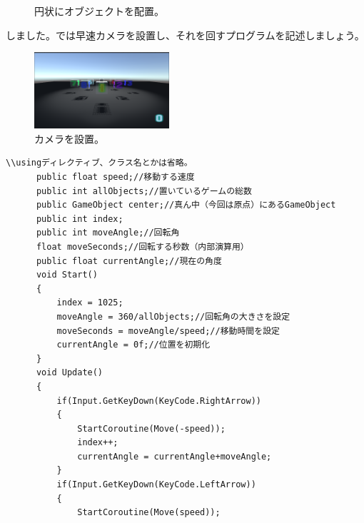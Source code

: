 \documentclass[b5paper,9pt,platex,dvipdfmx]{jsarticle}
\begin{document}
\begin{multicols*}{3}
\begin{figure}[H]
  \caption{円状にオブジェクトを配置。}
\end{figure}
しました。では早速カメラを設置し、それを回すプログラムを記述しましょう。\\
\begin{figure}[H]
  \centering
  \includegraphics[width=5cm]{3.png}
  \caption{カメラを設置。}
\end{figure}
\begin{lstlisting}[caption=MoveNext.cs]
\\usingディレクティブ、クラス名とかは省略。
      public float speed;//移動する速度
      public int allObjects;//置いているゲームの総数
      public GameObject center;//真ん中（今回は原点）にあるGameObject
      public int index;
      public int moveAngle;//回転角
      float moveSeconds;//回転する秒数（内部演算用）
      public float currentAngle;//現在の角度
      void Start()
      {
          index = 1025;
          moveAngle = 360/allObjects;//回転角の大きさを設定
          moveSeconds = moveAngle/speed;//移動時間を設定
          currentAngle = 0f;//位置を初期化
      }
      void Update()
      {
          if(Input.GetKeyDown(KeyCode.RightArrow))
          {
              StartCoroutine(Move(-speed));
              index++;
              currentAngle = currentAngle+moveAngle;
          }
          if(Input.GetKeyDown(KeyCode.LeftArrow))
          {
              StartCoroutine(Move(speed));


\end{lstlisting}
\end{multicols*}
\end{document}
